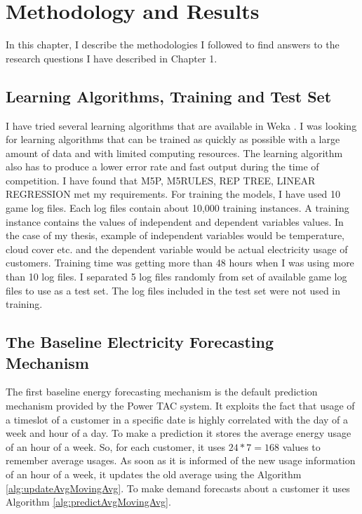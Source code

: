 
\chapter{Methodology and Results}

In this chapter, I describe the methodologies I followed to find answers to the research questions I have described in Chapter 1.


\section{Learning Algorithms, Training and Test Set}
I have tried several learning algorithms that are available in Weka \cite{witten2005data}. I was looking for learning algorithms that can be trained as quickly as possible with a large amount of data and with limited computing resources. The learning algorithm also has to produce a lower error rate and fast output during the time of competition. I have found that M5P, M5RULES, REP TREE, LINEAR REGRESSION \cite{witten2005data} met my requirements. For training the models, I have used 10 game log files. Each log files contain about 10,000 training instances. A training instance contains the values of independent and dependent variables values. In the case of my thesis, example of independent variables would be temperature, cloud cover etc. and the dependent variable would be actual electricity usage of customers. Training time was getting more than 48 hours when I was using more than 10 log files. I separated 5  log files randomly from set of available game log files to use as a test set. The log files included in the test set were not used in training.

\section{The Baseline Electricity Forecasting Mechanism}
The first baseline energy forecasting mechanism is the default prediction mechanism provided by the Power TAC system. It exploits the fact that usage of a timeslot of a customer in a specific date is highly correlated with the day of a week and hour of a day. To make a prediction it stores the average energy usage of an hour of a week. So, for each customer, it uses $24*7 = 168$ values to remember average usages. As soon as it is informed of the new usage information of an hour of a week, it updates the old average using the Algorithm \ref{alg:updateAvgMovingAvg}. To make demand forecasts about a customer it uses Algorithm \ref{alg:predictAvgMovingAvg}.

